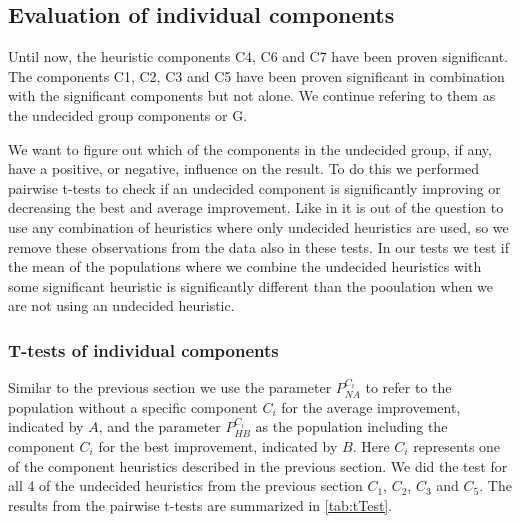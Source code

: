 \documentclass[../main.tex]{subfiles}
\begin{document}
\subsection{Evaluation of individual components}
\label{sec:evalI}
Until now, the heuristic components C4, C6 and C7 have been proven significant.
The components C1, C2, C3 and C5 have been proven significant in combination with the significant components but not alone.
We continue refering to them as the undecided group components or G. 
\par
We want to figure out which of the components in the undecided group, if any, have a positive, or negative, influence on the result.
To do this we performed pairwise t-tests to check if an undecided component is significantly improving or decreasing the best and average improvement.
Like in  it is out of the question to use any combination of heuristics where only undecided heuristics are used, so we remove these observations from the data also in these tests.
In our tests we test if the mean of the populations where we combine the undecided heuristics with some significant heuristic is significantly different than the pooulation when we are not using an undecided heuristic. 

\subsubsection{T-tests of individual components}
Similar to the previous section we use the parameter $P^{C_i}_{NA}$ to refer to the population without a specific component $C_i$ for the average improvement, indicated by $A$, and the parameter $P^{C_i}_{HB}$ as the population including the component $C_i$ for the best improvement, indicated by $B$. 
Here $C_i$ represents one of the component heuristics described in the previous section. 
We did the test for all 4 of the undecided heuristics from the previous section $C_1$, $C_2$, $C_3$ and $C_5$.
The results from the pairwise t-tests are summarized in \ref{tab:tTest}.
\end{document}

